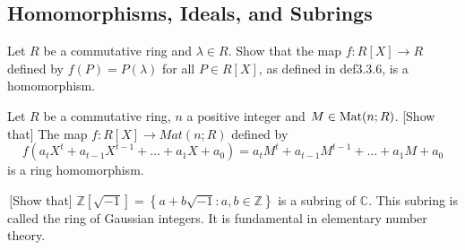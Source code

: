 \subsection{Homomorphisms, Ideals, and Subrings}
\item Let $R$ be a commutative ring and $\lambda \in R$. Show that the map $f : R[X] \rightarrow R$ defined by $f(P) = P(\lambda)$ for all $P \in R[X]$, as defined in def3.3.6, is a homomorphism.
\item Let $R$ be a commutative ring, $n$ a positive integer and $M \in \text{Mat}(n; R)$. [Show that] The map $f : R[X] \rightarrow Mat(n;R)$ defined by
  $$
  f(a_tX^t + a_{t-1}X^{t-1} + \dots + a_1X + a_0) = a_tM^t + a_{t-1}M^{t-1} + \dots + a_1M + a_0
 $$
is a ring homomorphism.
\item \,[Show that] $\mathbb{Z}[\sqrt{-1}] = \left\{ a + b \sqrt{-1} : a, b \in \mathbb{Z} \right\}$ is a subring of $\mathbb{C}$. This subring is called the ring of Gaussian integers. It is fundamental in elementary number theory.
